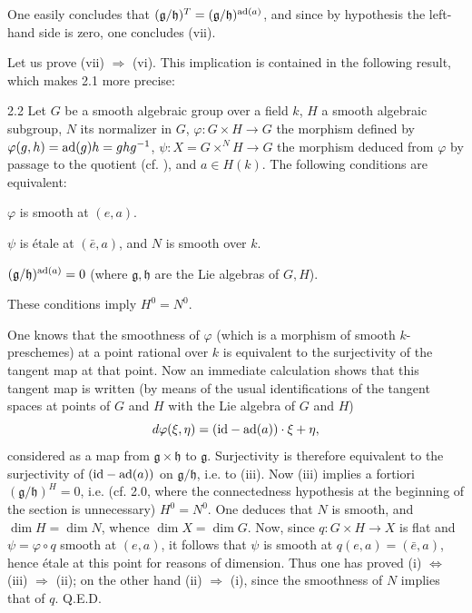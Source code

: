 One easily concludes that $(\mathfrak g/\mathfrak h)^T=
(\mathfrak g/\mathfrak h)^{\operatorname{ad}(a)}$, and since by hypothesis the left-hand
side is zero, one concludes (vii).

Let us prove (vii) $\Rightarrow$ (vi). This implication is contained in
the following result, which makes 2.1 more precise:
\begin{corollary}{2.2}\label{XIII.2.2}
Let $G$ be a smooth algebraic group over a field $k$, $H$ a smooth
algebraic subgroup, $N$ its normalizer in $G$, $\varphi:G\times H\to G$
the morphism defined by $\varphi(g,h)=\operatorname{ad}(g)h=ghg^{-1}$,
$\psi:X=G\times^N H\to G$ the morphism deduced from $\varphi$ by passage
to the quotient (cf. ), and $a\in H(k)$. The following conditions
are equivalent:
\begin{enumeratei}
\item $\varphi$ is smooth at $(e,a)$.
\item $\psi$ is \'etale at $(\bar e,a)$, and $N$ is smooth over $k$.
\item $(\mathfrak g/\mathfrak h)^{\operatorname{ad}(a)}=0$ (where $\mathfrak g,\mathfrak h$
are the Lie algebras of $G,H$).
\end{enumeratei}
These conditions imply $H^0=N^0$.
\end{corollary}
One knows that the smoothness of $\varphi$ (which is a morphism of smooth
$k$-preschemes) at a point rational over $k$ is equivalent to the
surjectivity of the tangent map at that point. Now an immediate
calculation shows that this tangent map is written (by means of the
usual identifications of the tangent spaces at points of $G$ and $H$
with the Lie algebra of $G$ and $H$)
\[
 d\varphi(\xi,\eta)=(\mathrm{id}-\operatorname{ad}(a))\cdot\xi+\eta,
\]
considered as a map from $\mathfrak g\times\mathfrak h$ to $\mathfrak g$.
Surjectivity is therefore equivalent to the surjectivity of
$(\mathrm{id}-\operatorname{ad}(a))$ on $\mathfrak g/\mathfrak h$, i.e. to (iii).
Now (iii) implies a fortiori $(\mathfrak g/\mathfrak h)^H=0$, i.e.
(cf. 2.0, where the connectedness hypothesis at the beginning of the
section is unnecessary) $H^0=N^0$. One deduces that $N$ is smooth, and
$\dim H=\dim N$, whence $\dim X=\dim G$. Now, since $q:G\times H\to X$
is flat and $\psi=\varphi\circ q$ smooth at $(e,a)$, it follows that
$\psi$ is smooth at $q(e,a)=(\bar e,a)$, hence \'etale at this point
for reasons of dimension. Thus one has proved (i) $\Leftrightarrow$
(iii) $\Rightarrow$ (ii); on the other hand (ii) $\Rightarrow$ (i),
since the smoothness of $N$ implies that of $q$. \hfill Q.E.D.

